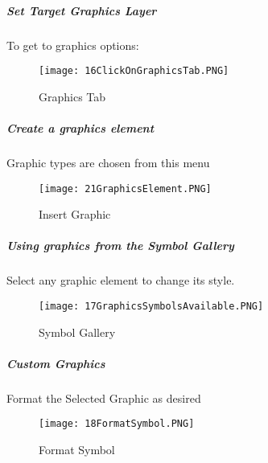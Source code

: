 \clearpage

\subparagraph{Set Target Graphics Layer}

To get to graphics options:
\vspace{.25in}

\vspace{.25in}


 
\begin{figure}[h!]
 \centering
     \texttt{[image: 16ClickOnGraphicsTab.PNG]}
 \caption{Graphics Tab}


 \end{figure} 


\clearpage

\subparagraph{Create a graphics element}



\noindent Graphic types are chosen from this menu

 
\begin{figure}[h!]
 \centering
     \texttt{[image: 21GraphicsElement.PNG]}
 \caption{Insert Graphic}


 \end{figure} 
\clearpage

\subparagraph{Using graphics from the Symbol Gallery}

\noindent Select any graphic element to change its style.


\begin{figure}[h!]
 \centering
     \texttt{[image: 17GraphicsSymbolsAvailable.PNG]}
 \caption{Symbol Gallery}


 \end{figure} 



\clearpage


\subparagraph{Custom Graphics}
Format the Selected Graphic as desired  


\begin{figure}[h!]
 \centering
     \texttt{[image: 18FormatSymbol.PNG]}
 \caption{Format Symbol}


 \end{figure} 

\clearpage


